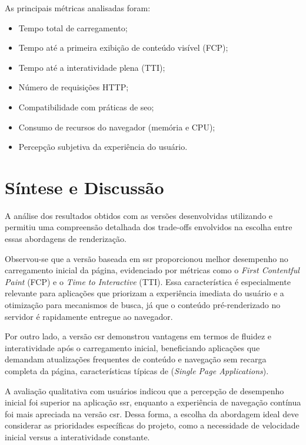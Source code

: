 As principais métricas analisadas foram:

\begin{itemize}
    \item Tempo total de carregamento;
    \item Tempo até a primeira exibição de conteúdo visível (FCP);
    \item Tempo até a interatividade plena (TTI);
    \item Número de requisições HTTP;
    \item Compatibilidade com práticas de \acrshort{seo};
    \item Consumo de recursos do navegador (memória e CPU);
    \item Percepção subjetiva da experiência do usuário.
\end{itemize}


\section{Síntese e Discussão}
\label{sec:sintese-e-discussao}

A análise dos resultados obtidos com as versões desenvolvidas utilizando  e  permitiu uma compreensão detalhada dos trade-offs envolvidos na escolha entre essas abordagens de renderização.

Observou-se que a versão baseada em \acrshort{ssr} proporcionou melhor desempenho no carregamento inicial da página, evidenciado por métricas como o \textit{First Contentful Paint} (FCP) e o \textit{Time to Interactive} (TTI). Essa característica é especialmente relevante para aplicações que priorizam a experiência imediata do usuário e a otimização para mecanismos de busca, já que o conteúdo pré-renderizado no servidor é rapidamente entregue ao navegador.

Por outro lado, a versão \acrshort{csr} demonstrou vantagens em termos de fluidez e interatividade após o carregamento inicial, beneficiando aplicações que demandam atualizações frequentes de conteúdo e navegação sem recarga completa da página, características típicas de  (\textit{Single Page Applications}).

A avaliação qualitativa com usuários indicou que a percepção de desempenho inicial foi superior na aplicação \acrshort{ssr}, enquanto a experiência de navegação contínua foi mais apreciada na versão \acrshort{csr}. Dessa forma, a escolha da abordagem ideal deve considerar as prioridades específicas do projeto, como a necessidade de velocidade inicial versus a interatividade constante.

